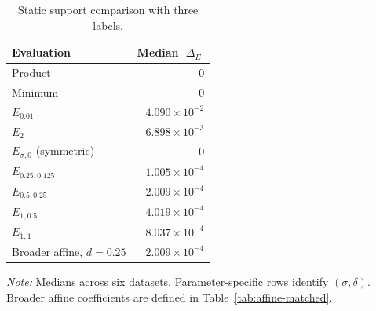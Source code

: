 \begin{table}[t]
\centering\color{red}
\caption{Static support comparison with three labels.}
\label{tab:static-operator-comparison}
\begin{tabular}{lr}
\toprule
Evaluation & Median $|\Delta_E|$ \\
\midrule
Product & $0$ \\
Minimum & $0$ \\
$E_{0.01}$ & $4.090\times10^{-2}$ \\
$E_2$ & $6.898\times10^{-3}$ \\
$E_{\sigma,0}$ (symmetric) & $0$ \\
$E_{0.25,0.125}$ & $1.005\times10^{-4}$ \\
$E_{0.5,0.25}$ & $2.009\times10^{-4}$ \\
$E_{1,0.5}$ & $4.019\times10^{-4}$ \\
$E_{1,1}$ & $8.037\times10^{-4}$ \\
Broader affine, $d=0.25$ & $2.009\times10^{-4}$ \\
\bottomrule
\end{tabular}
\par\vspace{0.4ex}\footnotesize\emph{Note:} Medians across six datasets. Parameter-specific rows identify $(\sigma,\delta)$. Broader affine coefficients are defined in Table~\ref{tab:affine-matched}.
\end{table}
